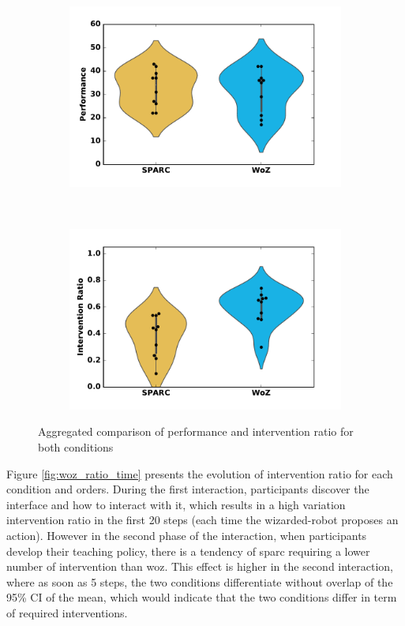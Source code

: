 \begin{figure}[ht]
	\centering
	\begin{subfigure}[t]{0.5\textwidth}
		\centering
		\includegraphics[width=1.0\textwidth]{./images/woz_perf.pdf}
	\end{subfigure}%
	~ 
	\begin{subfigure}[t]{0.5\textwidth}
		\centering
		\includegraphics[width=1.0\textwidth]{./images/woz_ratio.pdf}
	\end{subfigure}
	\caption{Aggregated comparison of performance and intervention ratio for both conditions}
	\label{fig:woz_comp}
\end{figure}

Figure \ref{fig:woz_ratio_time} presents the evolution of intervention ratio for each condition and orders. During the first interaction, participants discover the interface and how to interact with it, which results in a high variation intervention ratio in the first 20 steps (each time the wizarded-robot proposes an action). However in the second phase of the interaction,  when participants develop their teaching policy, there is a tendency of \gls{sparc} requiring a lower number of intervention than \gls{woz}. This effect is higher in the second interaction, where as soon as 5 steps, the two conditions differentiate without overlap of the 95\% CI of the mean, which would indicate that the two conditions differ in term of required interventions.

